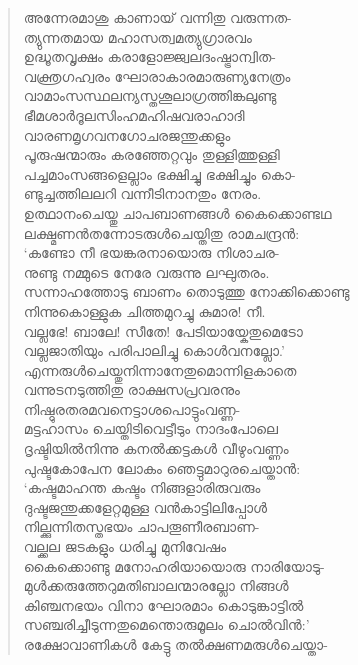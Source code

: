 \begin{verse}
അന്നേരമാശു കാണായ് വന്നിതു വരുന്നത-\\
ത്യുന്നതമായ മഹാസത്വമത്യുഗ്രാരവം\\
ഉദ്ധൂതവൃക്ഷം കരാളോജ്ജ്വലദംഷ്ട്രാന്വിത-\\
വക്ത്രഗഹ്വരം ഘോരാകാരമാരുണ്യനേത്രം\\
വാമാംസസ്ഥലന്യസ്തശൂലാഗ്രത്തിങ്കലുണ്ടു\\
ഭീമശാര്‍ദൂലസിംഹമഹിഷവരാഹാദി\\
വാരണമൃഗവനഗോചരജന്തുക്കളും\\
പൂരുഷന്മാരും കരഞ്ഞേറ്റവും തുള്ളിത്തുള്ളി\\
പച്ചമാംസങ്ങളെല്ലാം ഭക്ഷിച്ചു ഭക്ഷിച്ചും കൊ-\\
ണ്ടുച്ചത്തിലലറി വന്നീടിനാനതും നേരം.\\
ഉത്ഥാനംചെയ്തു ചാപബാണങ്ങള്‍ കൈക്കൊണ്ടഥ\\
ലക്ഷ്മണന്‍തന്നോടരുള്‍ചെയ്തിതു രാമചന്ദ്രന്‍:\\
‘കണ്ടോ നീ ഭയങ്കരനായൊരു നിശാചര-\\
നുണ്ടു നമ്മുടെ നേരേ വരുന്നു ലഘുതരം.\\
സന്നാഹത്തോടു ബാണം തൊടുത്തു നോക്കിക്കൊണ്ടു\\
നിന്നുകൊള്ളുക ചിത്തമുറച്ചു കുമാര! നീ.\\
വല്ലഭേ! ബാലേ! സീതേ! പേടിയായ്കേതുമെടോ\\
വല്ലജാതിയും പരിപാലിച്ചു കൊള്‍വനല്ലോ.’\\
എന്നരുള്‍ചെയ്തുനിന്നാനേതുമൊന്നിളകാതെ\\
വന്നുടനടുത്തിതു രാക്ഷസപ്രവരനും\\
നിഷ്ഠുരതരമവനെട്ടാശപൊട്ടുംവണ്ണ-\\
മട്ടഹാസം ചെയ്തിടിവെട്ടീടും നാദംപോലെ\\
ദൃഷ്ടിയില്‍നിന്നു കനല്‍ക്കട്ടകള്‍ വീഴുംവണ്ണം\\
പുഷ്ടകോപേന ലോകം ഞെട്ടുമാറുരചെയ്താന്‍:\\
‘കഷ്ടമാഹന്ത കഷ്ടം നിങ്ങളാരിരുവരും\\
ദുഷ്ടജന്തുക്കളേറ്റമുള്ള വന്‍കാട്ടിലിപ്പോള്‍\\
നില്ക്കുന്നിതസ്തഭയം ചാപതൂണീരബാണ-\\
വല്ക്കല ജടകളും ധരിച്ചു മുനിവേഷം\\
കൈക്കൊണ്ടു മനോഹരിയായൊരു നാരിയോടു-\\
മുള്‍ക്കരുത്തേറുമതിബാലന്മാരല്ലോ നിങ്ങള്‍\\
കിഞ്ചനഭയം വിനാ ഘോരമാം കൊടുങ്കാട്ടില്‍\\
സഞ്ചരിച്ചീടുന്നതുമെന്തൊരുമൂലം ചൊല്‍വിന്‍:’\\
രക്ഷോവാണികള്‍ കേട്ടു തല്‍ക്ഷണമരുള്‍ചെയ്താ-\\

\end{verse}
